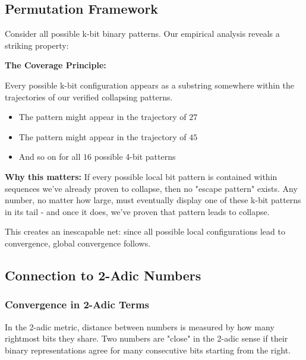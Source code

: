 \documentclass[10pt,letterpaper]{article}
\begin{document}
\subsection{Permutation Framework}
Consider all possible k-bit binary patterns. Our empirical analysis reveals a striking property:

\vspace{1em}

\textbf{The Coverage Principle:} 

Every possible k-bit configuration appears as a substring somewhere within the trajectories of our verified collapsing patterns.

\begin{itemize}
    \item The pattern  might appear in the trajectory of $27$
    \item The pattern  might appear in the trajectory of $45$
    \item And so on for all $16$ possible 4-bit patterns
\end{itemize}

\textbf{Why this matters:} If every possible local bit pattern is contained within sequences we've already proven to collapse, then no "escape pattern" exists. Any number, no matter how large, must eventually display one of these k-bit patterns in its tail - and once it does, we've proven that pattern leads to collapse.

\vspace{1em}

This creates an inescapable net: since all possible local configurations lead to convergence, global convergence follows.



\subsection{Connection to 2-Adic Numbers}

\subsubsection{Convergence in 2-Adic Terms}

In the 2-adic metric, distance between numbers is measured by how many rightmost bits they share. Two numbers are "close" in the 2-adic sense if their binary representations agree for many consecutive bits starting from the right.

\vspace{1em}
\end{document}
